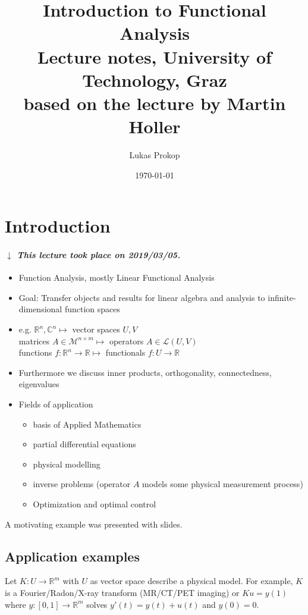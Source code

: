 \documentclass[a4paper]{article}
\title{
  Introduction to Functional Analysis \\
  \large{Lecture notes, University of Technology, Graz} \\
  based on the lecture by Martin Holler
}
\date{\today}
\author{Lukas Prokop}
\numberwithin{lecref}{section}
\newcommand{\dateref}[1]{%
  \begin{mdframed}[backgroundcolor=gray!10,innerbottommargin=0pt,innertopmargin=0pt]
    \paragraph{\textit{$\downarrow$ This lecture took place on #1.}}%
  \end{mdframed}%
}
\begin{document}
\maketitle
\tableofcontents

\section{Introduction}

\dateref{2019/03/05}

\begin{itemize}
	\item Function Analysis, mostly Linear Functional Analysis
	\item Goal: Transfer objects and results for linear algebra and analysis to infinite-dimensional function spaces
	\item e.g. $\mathbb R^n, \mathbb C^n \mapsto$ vector spaces $U, V$ \\
		matrices $A \in \mathcal M^{n \times m} \mapsto$ operators $A \in \mathcal L(U, V)$ \\
		functions $f: \mathbb R^n \to \mathbb R \mapsto$ functionals $f: U \to \mathbb R$
	\item Furthermore we discuss inner products, orthogonality, connectedness, eigenvalues
	\item Fields of application
	  \begin{itemize}
	  	\item basis of Applied Mathematics
	  	\item partial differential equations
	  	\item physical modelling
	  	\item inverse problems (operator $A$ models some physical measurement process)
	  	\item Optimization and optimal control
	  \end{itemize}
\end{itemize}

A motivating example was presented with slides.

\subsection{Application examples}

Let $K: U \to \mathbb R^m$ with $U$ as vector space describe a physical model.
For example, $K$ is a Fourier/Radon/X-ray transform (MR/CT/PET imaging) or
$K u = y(1)$ where $y: [0, 1] \to \mathbb R^m$ solves $y'(t) = y(t) + u(t)$ and $y(0) = 0$.
\end{document}
